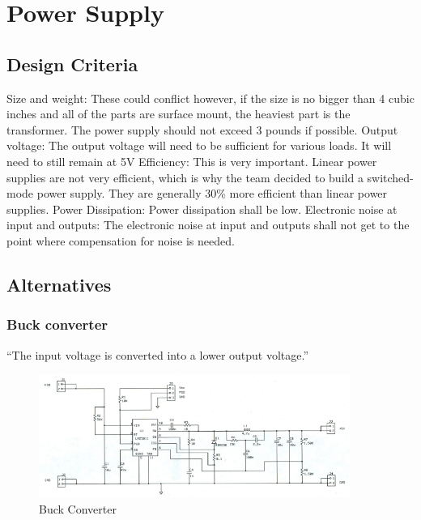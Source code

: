 \section{Power Supply}
\subsection{Design Criteria}
\begin{outline}[enumerate]
\1 Size and weight: These could conflict however, if the size is no bigger than 4 cubic inches and all of the parts are surface mount, the heaviest part is the transformer. The power supply should not exceed 3 pounds if possible.
\1 Output voltage: The output voltage will need to be sufficient for various loads. It will need to still remain at 5V
\1  Efficiency: This is very important. Linear power supplies are not very efficient, which is why the team decided to build a switched-mode power supply. They are generally 30\% more efficient than linear power supplies. 
\1 Power Dissipation: Power dissipation shall be low.
\1 Electronic noise at input and outputs: The electronic noise at input and outputs shall not get to the point where compensation for noise is needed.
\end{outline}
\subsection{Alternatives}
\subsubsection{Buck converter}
 ``The input voltage is converted into a lower output voltage.''\cite{SMPSD}
\begin{figure}[h]
\begin{center}
\includegraphics[width=4in]{includes/Buck}
\caption{Buck Converter}
\end{center}
\end{figure}


